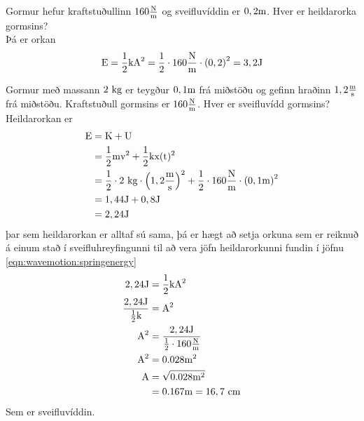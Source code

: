\begin{formalexample}
Gormur hefur kraftstuðullinn $160 \frac{\textrm{N}}{\textrm{m}}$ og sveifluvíddin er $0,2 \textrm{m}$. Hver
er heildarorka gormsins?
\\[4 ex]
Þá er orkan
\[
	\textrm{E} = \frac{1}{2} \text{k} \text{A}^2
		= \frac{1}{2} \cdot 160 \frac{\textrm{N}}{\textrm{m}} \cdot \left( 0,2 \right)^2
		= 3,2 \textrm{J}
\]
\end{formalexample}
\begin{formalexample}
Gormur með massann $2 \textrm{ k}\textrm{g}$ er teygður $0,1 \textrm{m}$ frá miðstöðu og gefinn 
hraðinn $1,2 \frac{\textrm{m}}{\textrm{s}}$ frá miðstöðu.
Kraftstuðull gormsins er $160 \frac{\textrm{N}}{\textrm{m}}$. Hver er sveifluvídd gormsins?
\\[4 ex]
Heildarorkan er
\begin{align*}
	\textrm{E} &= \textrm{K} + \textrm{U} \\
		&= \frac{1}{2} \textrm{m} \textrm{v}^2 + \frac{1}{2} \text{k} \textrm{x}(\textrm{t})^2 \\
		&= \frac{1}{2} \cdot 2 \textrm{ k}\textrm{g} \cdot \left( 1,2 \frac{\textrm{m}}{\textrm{s}} \right)^2 
			+ \frac{1}{2} \cdot 160 \frac{\textrm{N}}{\textrm{m}} \cdot \left( 0,1 \textrm{m} \right)^2 \\
		&= 1,44 \textrm{J} 
			+ 0,8 \textrm{J} \\
		&= 2,24 \textrm{J}
\end{align*}
þar sem heildarorkan er alltaf sú sama, þá er hægt að setja orkuna sem er
reiknuð á einum stað í sveifluhreyfingunni til að vera jöfn heildarorkunni
fundin í jöfnu \ref{eqn:wavemotion:springenergy}
\begin{align*}
	2,24 \textrm{J} &= \frac{1}{2} \text{k} \text{A}^2 \\
	\frac{2,24 \textrm{J}}{\frac{1}{2} \text{k} } &= \text{A}^2 \\
	\text{A}^2 &= \frac{2,24 \textrm{J}}{\frac{1}{2} \cdot 160 \frac{\textrm{N}}{\textrm{m}} }\\
	\text{A}^2 &= 0.028 \textrm{m}^2\\
	\text{A} &= \sqrt{0.028 \textrm{m}^2} \\
		&= 0.167 \textrm{m} = 16,7 \textrm{ c}\textrm{m}
\end{align*}
Sem er sveifluvíddin.
\end{formalexample}

